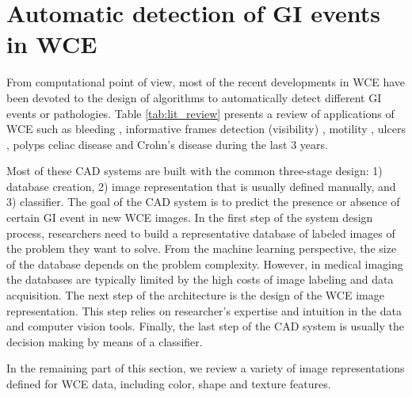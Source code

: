 \documentclass[review,12pt,3p]{elsarticle}
\begin{document}
\section{Automatic detection of GI events in WCE}

From computational point of view, most of the recent developments in WCE have been devoted to the design of algorithms to automatically detect different GI events or pathologies. Table \ref{tab:lit_review} presents a review of applications of WCE such as bleeding \cite{figueiredo2013computer,Sainju2014,6497444,yeh2014bleeding}, informative frames detection (visibility) \cite{sseguiTurbid,Sun2013,maghsoudi2014informative, Suenaga2014Bubbles, zhao2015general}, motility \cite{sseguiWrinkles, Malagelada2015, Drozdzal2015}, ulcers \cite{Eid2013,yeh2014bleeding}, polyps \cite{polypsMamonov,yuanpolyp,silivaPolyp2014, zhao2015general} celiac disease \cite{ciaccio2013implementation} and Crohn's disease \cite{6051474} during the last 3 years.

Most of these CAD systems are built with the common three-stage design: 1) database creation, 2) image representation that is usually defined manually, and 3) classifier. The goal of the CAD system is to predict the presence or absence of certain GI event in new WCE images. In the first step of the system design process, researchers need to build a representative database of labeled images of the problem they want to solve. From the machine learning perspective, the size of the database depends on the problem complexity. However, in medical imaging the databases are typically limited by the high costs of image labeling and data acquisition. The next step of the architecture is the design of the WCE image representation. This step relies on researcher's expertise and intuition in the data and computer vision tools. Finally, the last step of the CAD system is usually the decision making by means of a classifier.

In the remaining part of this section, we review a variety of image representations defined for WCE data, including color, shape and texture features.
\end{document}
